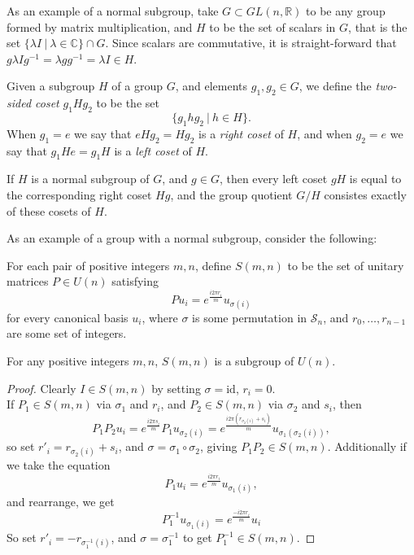 As an example of a normal subgroup, take $G \subset GL(n, \mathbb{R})$ to be any group formed by matrix multiplication, and $H$ to be the set of scalars in $G$, that is the set $\{\lambda I\ |\ \lambda \in \mathbb{C}\} \cap G$. Since scalars are commutative, it is straight-forward that $g\lambda I g^{-1} = \lambda gg^{-1} = \lambda I \in H$.

\begin{define}[Cosets]
	Given a subgroup $H$ of a group $G$, and elements $g_1, g_2 \in G$, we define the \emph{two-sided coset} $g_1Hg_2$ to be the set
	\[\{g_1hg_2\ |\ h \in H\}.\]
	When $g_1 = e$ we say that $eHg_2 = Hg_2$ is a \emph{right coset} of $H$, and when $g_2 = e$ we say that $g_1He = g_1H$ is a \emph{left coset} of $H$.
\end{define}

\begin{prop}
	If $H$ is a normal subgroup of $G$, and $g \in G$, then every left coset $gH$ is equal to the corresponding right coset $Hg$, and the group quotient $G/H$ consistes exactly of these cosets of $H$.
\end{prop}

As an example of a group with a normal subgroup, consider the following:
\begin{define}\label{generalised-perm}
	For each pair of positive integers $m, n$, define $S(m, n)$ to be the set of unitary matrices $P\in U(n)$ satisfying
	\[Pu_i = e^{\frac{i2\pi r_i}{m}}u_{\sigma(i)}\]
	for every canonical basis $u_i$, where $\sigma$ is some permutation in $\mathcal{S}_n$, and $r_0,\dots,r_{n-1}$ are some set of integers.
\end{define}

\begin{prop}
	For any positive integers $m, n$, $S(m, n)$ is a subgroup of $U(n)$.
\end{prop}
\begin{proof}
	Clearly $I \in S(m, n)$ by setting $\sigma = \text{id}$, $r_i = 0$.
	\\If $P_1 \in S(m, n)$ via $\sigma_1$ and $r_i$, and $P_2 \in S(m, n)$ via $\sigma_2$ and $s_i$, then
	\[P_1P_2u_i = e^{\frac{i2\pi s_i}{m}}P_1u_{\sigma_2(i)} = e^{\frac{i2\pi (r_{\sigma_2(i)} + s_i)}{m}}u_{\sigma_1(\sigma_2(i))},\]
	so set $r'_i = r_{\sigma_2(i)} + s_i$, and $\sigma = \sigma_1 \circ \sigma_2$, giving $P_1P_2 \in S(m, n)$. Additionally if we take the equation
	\[P_1u_i = e^{\frac{i2\pi r_i}{m}}u_{\sigma_1(i)},\]
	and rearrange, we get
	\[P_1^{-1}u_{\sigma_1(i)} = e^{\frac{-i2\pi r_i}{m}}u_i\]
	So set $r'_i = -r_{\sigma^{-1}_1(i)}$, and $\sigma = \sigma_1^{-1}$ to get $P_1^{-1} \in S(m, n)$.
\end{proof}

